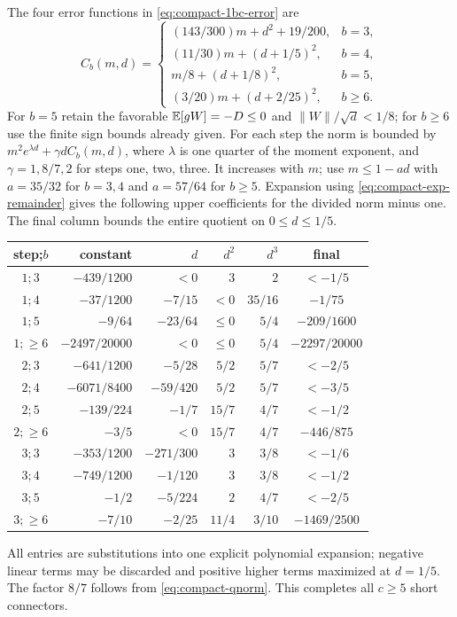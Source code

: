 The four error functions in \eqref{eq:compact-1bc-error} are
\[
 C_b(m,d)=\begin{cases}
 (143/300)m+d^2+19/200,&b=3,\\
 (11/30)m+(d+1/5)^2,&b=4,\\
 m/8+(d+1/8)^2,&b=5,\\
 (3/20)m+(d+2/25)^2,&b\ge6.
 \end{cases}
\]
For $b=5$ retain the favorable $\mathbb E[gW]=-D\le0$ and
$\|W\|/\sqrt d<1/8$; for $b\ge6$ use the finite sign bounds already given.
For each step the norm is bounded by
$m^2e^{\lambda d}+\gamma dC_b(m,d)$, where $\lambda$ is one quarter of
the moment exponent, and $\gamma=1,8/7,2$ for steps one, two, three.
It increases with $m$; use $m\le1-ad$ with $a=35/32$ for $b=3,4$ and
$a=57/64$ for $b\ge5$.
Expansion using \eqref{eq:compact-exp-remainder} gives the following
upper coefficients for the divided norm minus one. The final column
bounds the entire quotient on $0\le d\le1/5$.
\begin{center}\small
\begin{tabular}{@{}crrrrc@{}}\toprule
step;$b$&constant&$d$&$d^2$&$d^3$&final\\\midrule
$1;3$&$-439/1200$&$<0$&$3$&$2$&$<-1/5$\\
$1;4$&$-37/1200$&$-7/15$&$<0$&$35/16$&$-1/75$\\
$1;5$&$-9/64$&$-23/64$&$\le0$&$5/4$&$-209/1600$\\
$1;\ge6$&$-2497/20000$&$<0$&$\le0$&$5/4$&$-2297/20000$\\
$2;3$&$-641/1200$&$-5/28$&$5/2$&$5/7$&$<-2/5$\\
$2;4$&$-6071/8400$&$-59/420$&$5/2$&$5/7$&$<-3/5$\\
$2;5$&$-139/224$&$-1/7$&$15/7$&$4/7$&$<-1/2$\\
$2;\ge6$&$-3/5$&$<0$&$15/7$&$4/7$&$-446/875$\\
$3;3$&$-353/1200$&$-271/300$&$3$&$3/8$&$<-1/6$\\
$3;4$&$-749/1200$&$-1/120$&$3$&$3/8$&$<-1/2$\\
$3;5$&$-1/2$&$-5/224$&$2$&$4/7$&$<-2/5$\\
$3;\ge6$&$-7/10$&$-2/25$&$11/4$&$3/10$&$-1469/2500$\\\bottomrule
\end{tabular}
\end{center}
All entries are substitutions into one explicit polynomial expansion;
negative linear terms may be discarded and positive higher terms maximized
at $d=1/5$. The factor $8/7$ follows from \eqref{eq:compact-qnorm}.
This completes all $c\ge5$ short connectors.


